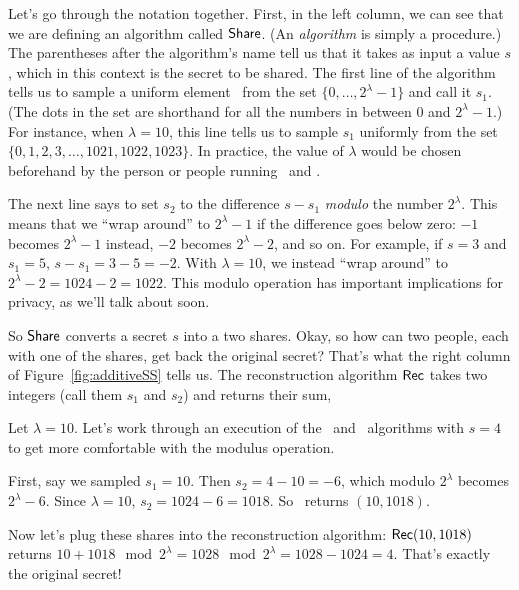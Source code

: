 Let's go through the notation together. First, in the left column, we can see that 
we are defining an algorithm called $\mathsf{Share}$. (An \emph{algorithm} is simply a procedure.)
The parentheses after the algorithm's name tell us that it takes as input a value $s$, which in 
this context is the secret to be shared. The first line of the algorithm tells us to sample
a uniform element\footnotemark~ from the set $\{0, \ldots, 2^\lambda-1\}$ and call it $s_1$. 
(The dots in the set are shorthand for all the numbers in between 0 and $2^\lambda-1$.) For instance, 
when $\lambda=10$, this line tells us to sample $s_1$ uniformly from the set $\{0, 1, 2, 3, \ldots, 
1021, 1022, 1023\}$. In practice, the value of $\lambda$ would be chosen beforehand by 
the person or people running \share~and \rec.

The next line says to set $s_2$ to the difference $s-s_1$ \emph{modulo} 
the number $2^\lambda$. This means that we ``wrap around'' to $2^\lambda-1$ 
if the difference goes below zero: $-1$ becomes $2^\lambda-1$ instead, $-2$ becomes 
$2^\lambda-2$, and so on.
For example, if $s=3$ and $s_1=5$, $s-s_1 = 3-5 = -2$. With $\lambda=10$,
we instead ``wrap around'' to $2^\lambda-2=1024-2=1022$. This modulo operation has 
important implications for privacy, as we'll talk about soon.


So $\mathsf{Share}$ converts a secret $s$ into a two shares. Okay, so how can 
two people, each with one of the shares, get back the original secret? That's
what the right column of Figure~\ref{fig:additiveSS} tells us. The reconstruction 
algorithm $\mathsf{Rec}$ takes two integers (call them $s_1$ and $s_2$) and returns their 
sum,

\begin{example}
    Let $\lambda=10$. Let's work through an execution of the \share~and
    \rec~algorithms with $s=4$ to get more comfortable with the modulus 
    operation.

    First, say we sampled $s_1=10$. Then $s_2 = 4-10 = -6$, which modulo 
    $2^\lambda$ becomes $2^\lambda-6$. Since $\lambda=10$, $s_2=1024-6=1018$.
    So \share~returns $(10,1018)$.

    Now let's plug these shares into the reconstruction algorithm: 
    $\mathsf{Rec}(10,1018)$ returns $10+1018 \mod 2^\lambda = 1028 \mod 2^\lambda 
    = 1028-1024 = 4$. That's exactly the original secret!
\end{example}

